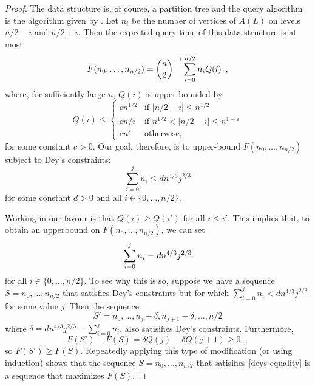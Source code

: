 \documentclass{patmorin}
\newcommand{\eps}{\varepsilon}
\begin{document}
\begin{proof}
  The data structure is, of course, a partition tree and the query
  algorithm is the algorithm given by .  Let $n_i$
  be the number of vertices of $A(L)$ on levels $n/2-i$ and $n/2+i$.  Then
  the expected query time of this data structure is at most
  \begin{equation}
    F(n_0,\ldots,n_{n/2}) 
      = \binom{n}{2}^{-1}\sum_{i=0}^{n/2} n_i Q(i) \enspace ,
     \eqlabel{expected}
  \end{equation}
  where, for sufficiently large $n$, $Q(i)$ is upper-bounded by
  \[
        Q(i) \le \begin{cases}
          cn^{1/2} & \text{if $|n/2-i| \le n^{1/2}$} \\
          cn/i      & \text{if $n^{1/2} < |n/2-i| \le n^{1-\eps}$} \\
          cn^{\eps} & \text{otherwise,}
        \end{cases}
  \]
  for some constant $c>0$.   Our goal, therefore, is to
  upper-bound $F(n_0,\ldots,n_{n/2})$ subject to Dey's constraints:
  \[
     \sum_{i=0}^{j}n_i \le dn^{4/3}j^{2/3} 
  \]
  for some constant $d>0$ and all $i\in\{0,\ldots,n/2\}$.

  Working in our favour is that $Q(i) \ge Q(i')$ for all $i \le i'$.
  This implies that, to obtain an upperbound on $F(n_0,\ldots,n_{n/2})$,
  we can set
  \begin{equation}
      \sum_{i=0}^{j}n_i = dn^{4/3}j^{2/3}   \eqlabel{deys-equality}
  \end{equation}
  for all $i\in\{0,\ldots,n/2\}$.  To see why this is so, suppose we
  have a sequence $S=n_0,\ldots,n_{n/2}$ that satisfies Dey's constraints
  but for which 
  $\sum_{i=0}^{j}n_i < dn^{4/3}j^{2/3}$ for some value $j$. Then the sequence
  \[
     S'=n_0,\ldots,n_{j}+\delta,n_{j+1}-\delta,\ldots,n/2
  \]
  where $\delta=dn^{4/3}j^{2/3}-\sum_{i=0}^{j}n_i$, also satisifies
  Dey's constraints.  Furthermore, 
  \[  F(S')-F(S) = \delta Q(j) - \delta Q(j+1) \ge 0 \enspace , \]
  so $F(S')\ge F(S)$.  Repeatedly applying this type of modification (or
  using induction) shows that the sequence $S=n_0,\ldots,n_{n/2}$ that
  satisifies \eqref{deys-equality} is a sequence that maximizes $F(S)$.


\end{proof}
\end{document}
